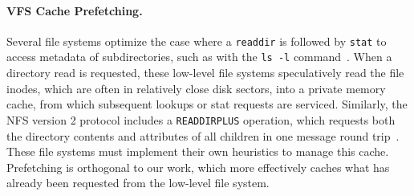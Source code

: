 



\paragraph{VFS Cache Prefetching.}
Several file systems optimize the case where a 
{\tt readdir} is followed by {\tt stat} to access metadata of subdirectories,
such as with the {\tt ls -l} command~\cite{lensing13dlfs,grid07thain,bisson12}.
When a directory read is requested, these low-level file systems speculatively 
read the file inodes, which are often in relatively close disk sectors,
into a private memory cache, from which subsequent lookups or stat requests are serviced.
Similarly, the NFS version 2 protocol includes a {\tt READDIRPLUS} operation,
which requests both the directory contents and attributes of all children
in one message round trip~\cite{rfc1813}.
These file systems must implement their own heuristics to manage this cache.
Prefetching is orthogonal to our work,
which more effectively caches what has already been requested from the low-level file system.

